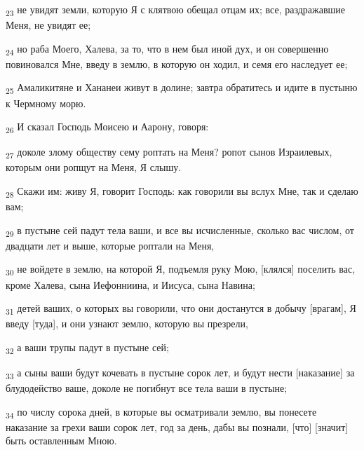 \begin{tcolorbox}
\textsubscript{23} не увидят земли, которую Я с клятвою обещал отцам их; все, раздражавшие Меня, не увидят ее;
\end{tcolorbox}
\begin{tcolorbox}
\textsubscript{24} но раба Моего, Халева, за то, что в нем был иной дух, и он совершенно повиновался Мне, введу в землю, в которую он ходил, и семя его наследует ее;
\end{tcolorbox}
\begin{tcolorbox}
\textsubscript{25} Амаликитяне и Хананеи живут в долине; завтра обратитесь и идите в пустыню к Чермному морю.
\end{tcolorbox}
\begin{tcolorbox}
\textsubscript{26} И сказал Господь Моисею и Аарону, говоря:
\end{tcolorbox}
\begin{tcolorbox}
\textsubscript{27} доколе злому обществу сему роптать на Меня? ропот сынов Израилевых, которым они ропщут на Меня, Я слышу.
\end{tcolorbox}
\begin{tcolorbox}
\textsubscript{28} Скажи им: живу Я, говорит Господь: как говорили вы вслух Мне, так и сделаю вам;
\end{tcolorbox}
\begin{tcolorbox}
\textsubscript{29} в пустыне сей падут тела ваши, и все вы исчисленные, сколько вас числом, от двадцати лет и выше, которые роптали на Меня,
\end{tcolorbox}
\begin{tcolorbox}
\textsubscript{30} не войдете в землю, на которой Я, подъемля руку Мою, [клялся] поселить вас, кроме Халева, сына Иефонниина, и Иисуса, сына Навина;
\end{tcolorbox}
\begin{tcolorbox}
\textsubscript{31} детей ваших, о которых вы говорили, что они достанутся в добычу [врагам], Я введу [туда], и они узнают землю, которую вы презрели,
\end{tcolorbox}
\begin{tcolorbox}
\textsubscript{32} а ваши трупы падут в пустыне сей;
\end{tcolorbox}
\begin{tcolorbox}
\textsubscript{33} а сыны ваши будут кочевать в пустыне сорок лет, и будут нести [наказание] за блудодейство ваше, доколе не погибнут все тела ваши в пустыне;
\end{tcolorbox}
\begin{tcolorbox}
\textsubscript{34} по числу сорока дней, в которые вы осматривали землю, вы понесете наказание за грехи ваши сорок лет, год за день, дабы вы познали, [что] [значит] быть оставленным Мною.
\end{tcolorbox}
